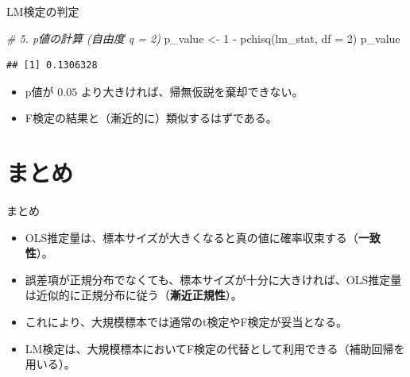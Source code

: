 \documentclass[
  ignorenonframetext,
]{beamer}
\newenvironment{Shaded}{\begin{snugshade}}{\end{snugshade}}
\newcommand{\AttributeTok}[1]{\textcolor[rgb]{0.77,0.63,0.00}{#1}}
\newcommand{\CommentTok}[1]{\textcolor[rgb]{0.56,0.35,0.01}{\textit{#1}}}
\newcommand{\DecValTok}[1]{\textcolor[rgb]{0.00,0.00,0.81}{#1}}
\newcommand{\FunctionTok}[1]{\textcolor[rgb]{0.00,0.00,0.00}{#1}}
\newcommand{\NormalTok}[1]{#1}
\newcommand{\OtherTok}[1]{\textcolor[rgb]{0.56,0.35,0.01}{#1}}
\newcommand{\SpecialCharTok}[1]{\textcolor[rgb]{0.00,0.00,0.00}{#1}}
\providecommand{\tightlist}{%
  \setlength{\itemsep}{0pt}\setlength{\parskip}{0pt}}
\begin{document}
\begin{frame}[fragile]{LM検定の判定}
\protect\hypertarget{lmux691cux5b9aux306eux5224ux5b9a}{}
\begin{Shaded}
\begin{Highlighting}[]
\CommentTok{\# 5. p値の計算 (自由度 q = 2)}
\NormalTok{p\_value }\OtherTok{\textless{}{-}} \DecValTok{1} \SpecialCharTok{{-}} \FunctionTok{pchisq}\NormalTok{(lm\_stat, }\AttributeTok{df =} \DecValTok{2}\NormalTok{)}
\NormalTok{p\_value}
\end{Highlighting}
\end{Shaded}

\begin{verbatim}
## [1] 0.1306328
\end{verbatim}

\begin{itemize}
\tightlist
\item
  p値が \(0.05\) より大きければ、帰無仮説を棄却できない。
\item
  F検定の結果と（漸近的に）類似するはずである。
\end{itemize}
\end{frame}

\hypertarget{ux307eux3068ux3081}{%
\section{まとめ}\label{ux307eux3068ux3081}}

\begin{frame}{まとめ}
\protect\hypertarget{ux307eux3068ux3081-1}{}
\begin{itemize}
\tightlist
\item
  OLS推定量は、標本サイズが大きくなると真の値に確率収束する（\textbf{一致性}）。
\item
  誤差項が正規分布でなくても、標本サイズが十分に大きければ、OLS推定量は近似的に正規分布に従う（\textbf{漸近正規性}）。
\item
  これにより、大規模標本では通常のt検定やF検定が妥当となる。
\item
  LM検定は、大規模標本においてF検定の代替として利用できる（補助回帰を用いる）。
\end{itemize}
\end{frame}
\end{document}
